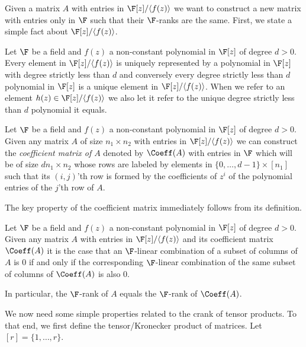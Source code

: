 Given a matrix $A$ with entries in $\F[z]/\langle f(z)\rangle$ we want to construct a new matrix with entries only in $\F$ such that their $\F$-ranks are the same. First, we state a simple fact about $\F[z]/\langle f(z)\rangle$.

\begin{lem}
Let $\F$ be a field and $f(z)$ a non-constant polynomial in $\F[z]$ of degree $d>0$. Every element in $\F[z]/\langle f(z)\rangle$ is uniquely represented by a polynomial in $\F[z]$ with degree strictly less than $d$ and conversely every degree strictly less than $d$ polynomial in $\F[z]$ is a unique element in $\F[z]/\langle f(z)\rangle$. When we refer to an element $h(z)\in \F[z]/\langle f(z)\rangle$ we also let it refer to the unique degree strictly less than $d$ polynomial it equals.
\end{lem}



\begin{define}
Let $\F$ be a field and $f(z)$ a non-constant polynomial in $\F[z]$ of degree $d>0$. Given any matrix $A$ of size $n_1\times n_2$ with entries in $\F[z]/\langle f(z)\rangle$ we can construct the {\em coefficient matrix of $A$} denoted by {\em $\Coeff(A)$} with entries in $\F$ which will be of size $dn_1\times n_2$ whose rows are labeled by elements in $\{0,\hdots,d-1\}\times [n_1]$ such that its $(i,j)$'th row is formed by the coefficients of $z^i$ of the polynomial entries of the $j$'th row of $A$. 
\end{define}

The key property of the coefficient matrix immediately follows from its definition.

\begin{lem}\label{lem:coeffR}
Let $\F$ be a field and $f(z)$ a non-constant polynomial in $\F[z]$ of degree $d>0$. Given any matrix $A$ with entries in $\F[z]/\langle f(z)\rangle$ and its coefficient matrix {\em $\Coeff(A)$} it is the case that an $\F$-linear combination of a subset of columns of $A$ is $0$ if and only if the corresponding $\F$-linear combination of the same subset of columns of {\em $\Coeff(A)$} is also $0$.

In particular, the $\F$-rank of $A$ equals the $\F$-rank of {\em $\Coeff(A)$}.
\end{lem}

We now need some simple properties related to the crank of tensor products. To that end, we first define the tensor/Kronecker product of matrices. Let $[r]=\{1,\hdots,r\}$.

